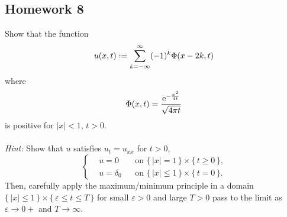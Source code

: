 \subsection{Homework 8}
\begin{problem}
  Show that the function
  \[
    u(x,t)\defeq\sum_{k=-\infty}^\infty (-1)^k\Phi(x-2k,t)
  \]
  where
  \[
    \Phi(x,t)=\frac{\mathrm{e}^{-\frac{x^2}{4t}}}{\sqrt{4\pi t}}
  \]
  is positive for \(|x|<1\), \(t>0\).
  \\\\
  \emph{Hint:} Show that \(u\) satisfies \(u_t=u_{xx}\) for \(t>0\),
  \[
    \left\{
      \begin{aligned}
        &u=0&&\text{on \(\{\,|x|=1\,\}\times\{\,t\geq 0\,\}\),}\\
        &u=\delta_0&&\text{on \(\{\,|x|\leq 1\,\}\times\{\,t=0\,\}\).}
      \end{aligned}
    \right.
  \]
  Then, carefully apply the maximum/minimum principle in a domain
  \(\{\,|x|\leq 1\,\}\times\{\,\varepsilon\leq t\leq T\,\}\) for small
  \(\varepsilon>0\) and large \(T>0\) pass to the limit as
  \(\varepsilon\to 0+\) and \(T\to\infty\).
\end{problem}
